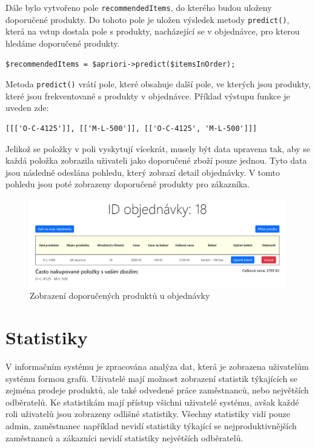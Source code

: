  Dále bylo vytvořeno pole \texttt{recommendedItems}, do kterého budou uloženy doporučené produkty. Do tohoto pole je uložen výsledek metody \texttt{predict()}, která na vstup dostala pole s produkty, nacházející se v objednávce, pro kterou hledáme doporučené produkty.

\begin{verbatim}
$recommendedItems = $apriori->predict($itemsInOrder);
\end{verbatim}

 Metoda \texttt{predict()} vrátí pole, které obsahuje další pole, ve kterých jsou produkty, které jsou frekventované s produkty v objednávce. Příklad výstupu funkce je uveden zde:

\begin{verbatim}
[[['O-C-4125']], [['M-L-500']], [['O-C-4125', 'M-L-500']]] 
\end{verbatim}

Jelikož se položky v poli vyskytují vícekrát, musely být data upravena tak, aby se každá položka zobrazila uživateli jako doporučené zboží pouze jednou. Tyto data jsou následně odeslána pohledu, který zobrazí detail objednávky. V tomto pohledu jsou poté zobrazeny doporučené produkty pro zákazníka. \cite{apriorilibrary}


\begin{figure}[H]
    \centering
    \includegraphics[width=140mm]{obrazky-figures/doporucene.png}
    \caption{Zobrazení doporučených produktů u objednávky}
\end{figure}


\section{Statistiky}
V informačním systému je zpracována analýza dat, která je zobrazena uživatelům systému formou grafů. Uživatelé mají možnost zobrazení statistik týkajících se zejména prodeje produktů, ale také odvedené práce zaměstnanců, nebo největších odběratelů. Ke statistikám mají přístup všichni uživatelé systému, avšak každé roli uživatelů jsou zobrazeny odlišné statistiky. Všechny statistiky vidí pouze admin, zaměstnanec například nevidí statistiky týkající se nejproduktivnějších zaměstnanců a zákazníci nevidí statistiky největších odběratelů.

